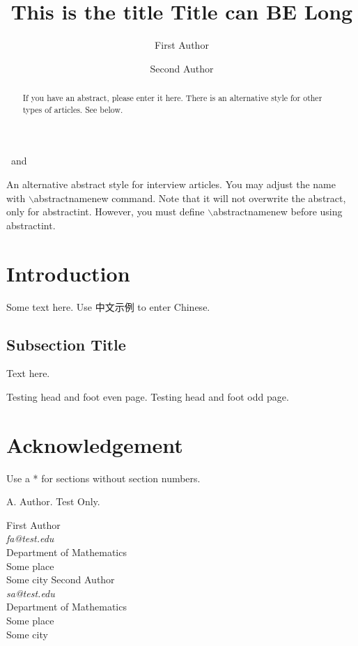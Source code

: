 \documentclass{iccmpdfwf}
\def\textzh#1{{\textzhfamily #1}}%
\theoremstyle{plain}
\theoremstyle{definition}
\begin{document}
\begin{frontmatter}

\title{This is the title Title can BE Long}

\author{First Author}%
\ and %
\author{Second Author}%



\begin{abstract}
If you have an abstract, please enter it here. There is an alternative style for other types of articles. See below.
\end{abstract}

\def\abstractnamenew{Biography.}
\begin{abstractint}
An alternative abstract style for interview articles. You may adjust the name with $\backslash$abstractnamenew command. Note that it will not overwrite the abstract, only for abstractint. However, you must define $\backslash$abstractnamenew before using abstractint.
\end{abstractint}

\end{frontmatter}
%
\tableofcontents

 
\section{Introduction} \label{secIn}
Some text here. Use \textzh{中文示例} to enter Chinese.

\subsection{Subsection Title}
Text here. \cite{t1}

\newpage
Testing head and foot even page.
\newpage
Testing head and foot odd page.
\section*{Acknowledgement}
Use a * for sections without section numbers.


\begin{thebibliography}{999}
 A. Author. Test Only.
\end{thebibliography}

\begin{flushright}
First Author\\
{\it fa@test.edu}\\
Department of Mathematics\\
Some place\\
Some city
\vskip 0.5pc
Second Author\\
{\it sa@test.edu}\\
Department of Mathematics\\
Some place\\
Some city
\end{flushright}
\end{document}
